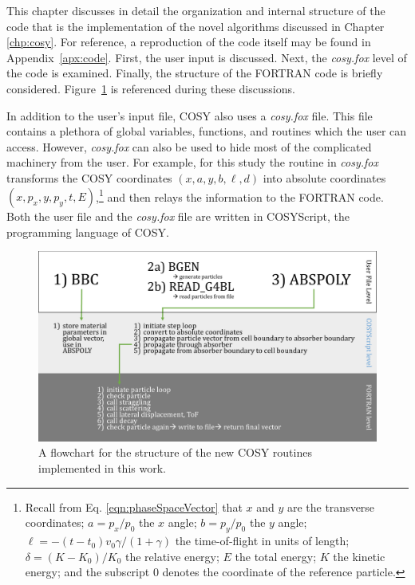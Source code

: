 This chapter discusses in detail the organization and internal structure of the code that is the implementation of the novel algorithms discussed in Chapter \ref{chp:cosy}. For reference, a reproduction of the code itself may be found in Appendix~\ref{apx:code}. First, the user input is discussed. Next, the \textit{cosy.fox} level of the code is examined. Finally, the structure of the FORTRAN code is briefly considered. Figure~\ref{fig:cosy_flowchart} is referenced during these discussions.

In addition to the user's input file, COSY also uses a \textit{cosy.fox} file. This file contains a plethora of global variables, functions, and routines which the user can access. However, \textit{cosy.fox} can also be used to hide most of the complicated machinery from the user. For example, for this study the routine in \textit{cosy.fox} transforms the COSY coordinates $(x, a, y, b, \ell, d)$ into absolute coordinates $(x, p_x, y, p_y, t, E)$,\footnote{Recall from Eq. \eqref{eqn:phaseSpaceVector} that $x$ and $y$ are the transverse coordinates; $a=p_x/p_0$ the $x$ angle; $b=p_y/p_0$ the $y$ angle; $\ell=-(t-t_0)v_0\gamma/(1+\gamma)$ the time-of-flight in units of length; $\delta=(K-K_0)/K_0$ the relative energy; $E$ the total energy; $K$ the kinetic energy; and the subscript $0$ denotes the coordinate of the reference particle.} and then relays the information to the FORTRAN code. Both the user file and the \textit{cosy.fox} file are written in COSYScript, the programming language of COSY. 

\begin{figure}[!htb]
  \centering
    \includegraphics[width=\textwidth]{Figures/cosy_flowchart} 
  \caption{A flowchart for the structure of the new COSY routines implemented in this work.}
  \label{fig:cosy_flowchart}
\end{figure}

